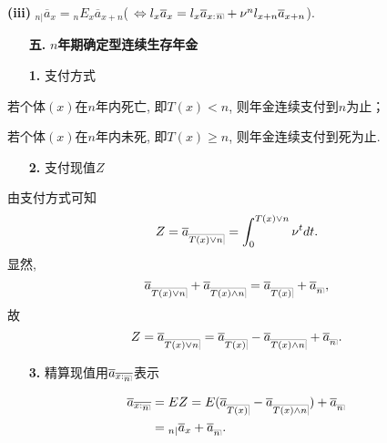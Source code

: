 \documentclass[a4paper,openany, 10pt]{ctexbook}
\makeatletter
\newcommand{\hei}{\CJKfamily{hei}}      %
\DeclareRobustCommand{\annu}[1]{_{%
    \def\arraystretch{0}%
    \setlength\arraycolsep{1pt}%
    \setlength\arrayrulewidth{.2pt}%
    \begin{array}[b]{@{}c|}\hline
        \\[\arraycolsep]%
        \scriptstyle #1%
    \end{array}%
}}
\makeatother
\begin{document}
{\rm\bf(iii)} $_{n|}\overline{a}_{x}={}_nE_x\overline{a}_{x+n}$(
$\Leftrightarrow l_x\overline{a}_{x}=l_x\overline{a}_{x:}{}\annu{n}+\nu^nl_{x+n}
\overline{a}_{x+n}$).


\begin{itemize}
    \item[{\bf\hei 五.}]{\bf\hei $n$年期确定型连续生存年金}
\end{itemize}

\begin{itemize}
    \item[{\bf\hei 1.}] 支付方式
\end{itemize}

若个体$(x)$在$n$年内死亡, 即$T(x)<n$, 则年金连续支付到$n$为止；

若个体$(x)$在$n$年内未死, 即$T(x)\ge n$, 则年金连续支付到死为止.

\begin{itemize}
    \item[{\bf\hei 2.}] 支付现值$Z$
\end{itemize}
由支付方式可知
$$Z=\overline {a}_{\annu{T(x)\lor n}}=\int_0^{{T(x)\lor n}}\nu^tdt.$$
显然, $$\overline {a}_{\annu{T(x)\lor n}}+\overline {a}_{\annu{T(x)\land n}}=\overline {a}_{\annu{T(x)}}+\overline {a}_{\annu{n}},$$
故$$Z=\overline {a}_{\annu{T(x)\lor n}}=\overline {a}_{\annu{T(x)}}-\overline {a}_{\annu{T(x)\land n}}+\overline {a}_{\annu{n}}.$$

\begin{itemize}
    \item[{\bf\hei 3.}] 精算现值用$\overline a_{\overline{x:\annu{n}}}$表示
\end{itemize}
$$
    \begin{aligned}
        \overline a_{\overline{x:\annu{n}}} & =EZ=E(\overline a_{\annu {T(x) }}-\overline a_{\annu {T(x) \land n}})+\overline a_{\annu {n}}                                 \\
        &={}_{n|}\overline{a}_{x}+\overline a_{\annu {n}}.
    \end{aligned}
$$
\end{document}
